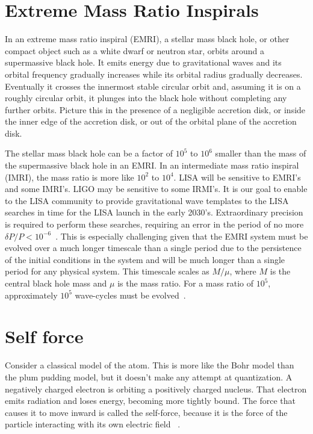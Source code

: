 \section{Extreme Mass Ratio Inspirals}
In an extreme mass ratio inspiral (EMRI), a stellar mass black hole, or other compact object such as a white dwarf or neutron star, orbits around a supermassive black hole. It emits energy due to gravitational waves and its orbital frequency gradually increases while its orbital radius gradually decreases. Eventually it crosses the innermost stable circular orbit and, assuming it is on a roughly circular orbit, it plunges into the black hole without completing any further orbits. Picture this in the presence of a negligible accretion disk, or inside the inner edge of the accretion disk, or out of the orbital plane of the accretion disk. 

The stellar mass black hole can be a factor of $10^5$ to $10^6$ smaller than the mass of the supermassive black hole in an EMRI. In an intermediate mass ratio inspiral (IMRI), the mass ratio is more like $10^2$ to $10^4$. LISA will be sensitive to EMRI's and some IMRI's. LIGO may be sensitive to some IRMI's. It is our goal to enable to the LISA community to provide gravitational wave templates to the LISA searches in time for the LISA launch in the early 2030's. Extraordinary precision is required to perform these searches, requiring an error in the period of no more $\delta P/P<10^{-6}$~\cite{LISA02062017}. This is especially challenging given that the EMRI system must be evolved over a much longer timescale than a single period due to the persistence of the initial conditions in the system and will be much longer than a single period for any physical system. This timescale scales as $M/\mu$, where $M$ is the central black hole mass and $\mu$ is the mass ratio. For a mass ratio of $10^5$, approximately $10^5$ wave-cycles must be evolved~\cite{LISA02062017}.

\section{Self force}

Consider a classical model of the atom. This is more like the Bohr model than the plum pudding model, but it doesn't make any attempt at quantization. A negatively charged electron is orbiting a positively charged nucleus. That electron emits radiation and loses energy, becoming more tightly bound. The force that causes it to move inward is called the self-force, because it is the force of the particle interacting with its own electric field ~\cite{dirac1938}.

